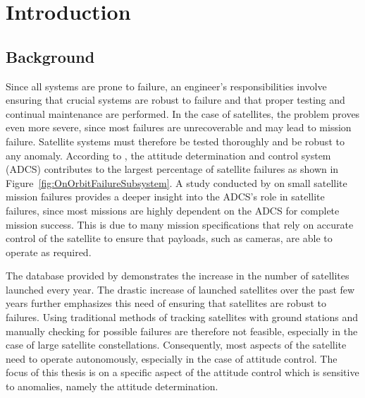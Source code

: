 %
%


\chapter{Introduction}
\label{chap:Introduction}
\section{Background}
Since all systems are prone to failure, an engineer's responsibilities involve ensuring that crucial systems are robust to failure and that proper testing and continual maintenance are performed. In the case of satellites, the problem proves even more severe, since most failures are unrecoverable and may lead to mission failure. Satellite systems must therefore be tested thoroughly and be robust to any anomaly. According to \cite{tafazoli2009study}, the attitude determination and control system (ADCS) contributes to the largest percentage of satellite failures as shown in Figure~\ref{fig:OnOrbitFailureSubsystem}. A study conducted by \cite{Jacklin2019} on small satellite mission failures provides a deeper insight into the ADCS's role in satellite failures, since most missions are highly dependent on the ADCS for complete mission success. This is due to many mission specifications that rely on accurate control of the satellite to ensure that payloads, such as cameras, are able to operate as required.


\begin{figure*}[!htb]
	\centering
	\caption{On-orbit failures categorised by the subsystem responsible for the mission failure~\cite{tafazoli2009study}.}
	\label{fig:OnOrbitFailureSubsystem}
\end{figure*}

The database provided by \cite{swartwout2015cubesat} demonstrates the increase in the number of satellites launched every year. The drastic increase of launched satellites over the past few years further emphasizes this need of ensuring that satellites are robust to failures. Using traditional methods of tracking satellites with ground stations and manually checking for possible failures are therefore not feasible, especially in the case of large satellite constellations. Consequently, most aspects of the satellite need to operate autonomously, especially in the case of attitude control. The focus of this thesis is on a specific aspect of the attitude control which is sensitive to anomalies, namely the attitude determination. 

